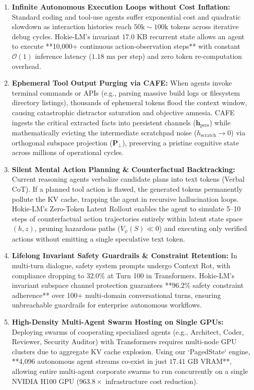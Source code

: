 \begin{enumerate}[leftmargin=*]
    \item \textbf{Infinite Autonomous Execution Loops without Cost Inflation:} Standard coding and tool-use agents suffer exponential cost and quadratic slowdown as interaction histories reach $50\text{k} \sim 100\text{k}$ tokens across iterative debug cycles. Hokie-LM's invariant $17.0\text{ KB}$ recurrent state allows an agent to execute **10,000+ continuous action-observation steps** with constant $\mathcal{O}(1)$ inference latency ($1.18\text{ ms}$ per step) and zero token re-computation overhead.
    \item \textbf{Ephemeral Tool Output Purging via CAFE:} When agents invoke terminal commands or APIs (e.g., parsing massive build logs or filesystem directory listings), thousands of ephemeral tokens flood the context window, causing catastrophic distractor saturation and objective amnesia. CAFE ingests the critical extracted facts into persistent channels ($\mathbf{h}_{\text{pers}}$) while mathematically evicting the intermediate scratchpad noise ($h_{\text{scratch}} \rightarrow 0$) via orthogonal subspace projection ($\mathbf{P}_{\perp}$), preserving a pristine cognitive state across millions of operational cycles.
    \item \textbf{Silent Mental Action Planning \& Counterfactual Backtracking:} Current reasoning agents verbalize candidate plans into text tokens (Verbal CoT). If a planned tool action is flawed, the generated tokens permanently pollute the KV cache, trapping the agent in recursive hallucination loops. Hokie-LM's Zero-Token Latent Rollout enables the agent to simulate 5--10 steps of counterfactual action trajectories entirely within latent state space $(h, z)$, pruning hazardous paths ($V_\psi(S) \ll 0$) and executing only verified actions without emitting a single speculative text token.
    \item \textbf{Lifelong Invariant Safety Guardrails \& Constraint Retention:} In multi-turn dialogue, safety system prompts undergo Context Rot, with compliance dropping to $32.0\%$ at Turn 100 in Transformers. Hokie-LM's invariant subspace channel protection guarantees **$96.2\%$ safety constraint adherence** over 100+ multi-domain conversational turns, ensuring unbreachable guardrails for enterprise autonomous workflows.
    \item \textbf{High-Density Multi-Agent Swarm Hosting on Single GPUs:} Deploying swarms of cooperating specialized agents (e.g., Architect, Coder, Reviewer, Security Auditor) with Transformers requires multi-node GPU clusters due to aggregate KV cache explosion. Using our `PagedState` engine, **4,096 autonomous agent streams co-exist in just $17.41\text{ GB}$ VRAM**, allowing entire multi-agent corporate swarms to run concurrently on a single NVIDIA H100 GPU ($963.8\times$ infrastructure cost reduction).
\end{enumerate}

